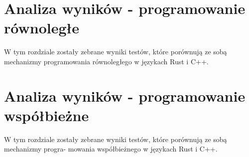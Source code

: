 \chapter{Analiza wyników - programowanie równoległe}
W tym rozdziale zostały zebrane wyniki testów, które porównują ze sobą mechanizmy programowania równoległego w językach Rust i C++.
\nopagebreak


\chapter{Analiza wyników - programowanie współbieżne}
W tym rozdziale zostały zebrane wyniki testów, które porównują ze sobą mechanizmy progra-
mowania współbieżnego w językach Rust i C++.

